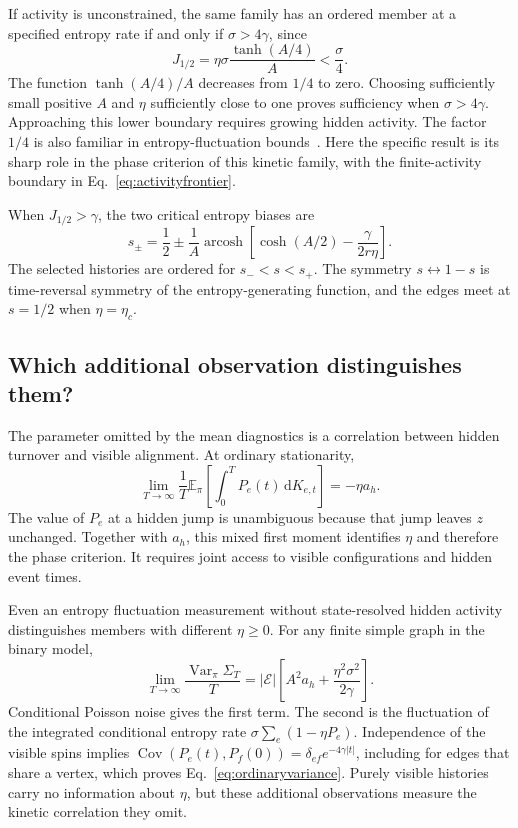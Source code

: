 \documentclass[aps,pre,reprint,amsmath,amssymb,longbibliography,floatfix]{revtex4-2}
\newcommand{\E}{\mathbb E}
\newcommand{\dd}{\,\mathrm d}
\newcommand{\Var}{\operatorname{Var}}
\newcommand{\Cov}{\operatorname{Cov}}
\begin{document}
If activity is unconstrained, the same family has an ordered member
at a specified entropy rate if and only if $\sigma>4\gamma$, since
\begin{equation}
 J_{1/2}=\eta\sigma\frac{\tanh(A/4)}A<\frac\sigma4.
 \label{eq:entropybudget}
\end{equation}
The function $\tanh(A/4)/A$ decreases from $1/4$ to zero. Choosing
sufficiently small positive $A$ and $\eta$ sufficiently close to one
proves sufficiency when $\sigma>4\gamma$.
Approaching this lower boundary requires growing hidden activity.
The factor $1/4$ is also familiar in entropy-fluctuation
bounds~\cite{PietzonkaBaratoSeifert2016,GingrichHorowitzPerunovEngland2016}.
Here the specific result is its sharp role in the phase criterion of
this kinetic family, with the finite-activity boundary in
Eq.~\eqref{eq:activityfrontier}.

When $J_{1/2}>\gamma$, the two critical entropy biases are
\begin{equation}
s_\pm=\frac12\pm\frac1A\operatorname{arcosh}
 \left[\cosh(A/2)-\frac{\gamma}{2r\eta}\right].
 \label{eq:edges}
\end{equation}
The selected histories are ordered for $s_-<s<s_+$. The symmetry $s\leftrightarrow1-s$ is
time-reversal symmetry of the entropy-generating function, and the
edges meet at $s=1/2$ when $\eta=\eta_c$.

\subsection{Which additional observation distinguishes them?}
The parameter omitted by the mean diagnostics is a correlation between
hidden turnover and visible alignment. At ordinary stationarity,
\begin{equation}
 \lim_{T\to\infty}\frac1T\E_\pi\left[\int_0^T P_e(t)\dd K_{e,t}\right]
 =-\eta a_h.
 \label{eq:crossreadout}
\end{equation}
The value of $P_e$ at a hidden jump is unambiguous because that jump
leaves $z$ unchanged. Together with $a_h$, this mixed first moment
identifies $\eta$ and therefore the phase criterion. It requires
joint access to visible configurations and hidden event times.

Even an entropy fluctuation measurement without state-resolved hidden
activity distinguishes members with different $\eta\geq0$.
For any finite simple graph in the binary model,
\begin{equation}
 \lim_{T\to\infty}\frac{\Var_\pi\Sigma_T}{T}
 =|\mathcal E|\left[A^2a_h+\frac{\eta^2\sigma^2}{2\gamma}\right].
 \label{eq:ordinaryvariance}
\end{equation}
Conditional Poisson noise gives the first term. The second is the
fluctuation of the integrated conditional entropy rate
$\sigma\sum_e(1-\eta P_e)$. Independence of the visible spins implies
$\Cov(P_e(t),P_f(0))=\delta_{ef}e^{-4\gamma|t|}$, including for edges
that share a vertex, which proves Eq.~\eqref{eq:ordinaryvariance}.
Purely visible histories carry no information about $\eta$, but these
additional observations measure the kinetic correlation they omit.
\end{document}

